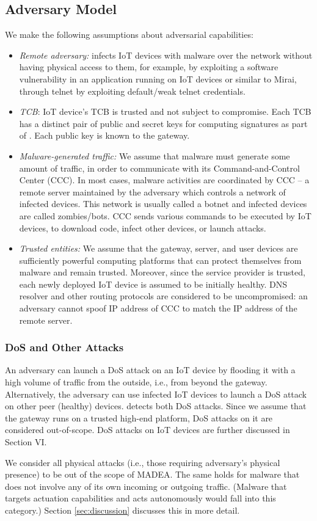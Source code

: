 \subsection{Adversary Model} \label{subsec:advesarymodel}
We make the following assumptions about adversarial capabilities: 
\begin{itemize}
    \item \textit{Remote adversary:} infects IoT devices with malware over the network without having physical access to them, for example, 
    by exploiting a software vulnerability in an application running on IoT devices or similar to Mirai, through telnet by exploiting default/weak telnet credentials.
    \item \textit{TCB}: IoT device's TCB is trusted and not subject to compromise. Each TCB has a distinct pair of public and secret keys for computing signatures as part of \ra. Each public key is known to the gateway.
    \item \textit{Malware-generated traffic:} We assume that malware must generate some amount of traffic, in order to 
    communicate with its Command-and-Control Center (CCC). In most cases, malware activities are coordinated by CCC -- a remote server maintained by the adversary which controls a network of infected devices. This network is usually called a botnet and infected devices are called zombies/bots. CCC sends various commands to be executed by IoT devices, \eg{} to download code, infect other devices, or launch attacks. 
    \item \textit{Trusted entities:} We assume that the gateway, server, and user devices are sufficiently powerful computing platforms that can protect themselves from malware and remain trusted. Moreover, since the service provider is trusted, each newly deployed IoT device is assumed to be initially healthy. DNS resolver and other routing protocols are considered to be uncompromised: an adversary cannot spoof IP address of CCC to match the IP address of the remote server.
\end{itemize}

\subsubsection{DoS and Other Attacks}
An adversary can launch a DoS attack
on an IoT device by flooding it with a high volume of traffic from
the outside, i.e., from beyond the gateway. Alternatively, the adversary can use
infected IoT devices to launch a DoS attack on other peer (healthy) devices. \system detects both DoS attacks. Since we assume
that the gateway runs on a trusted high-end platform, DoS attacks on it are considered out-of-scope. DoS attacks on IoT devices are further discussed in Section VI.

We consider all physical attacks (i.e., those requiring adversary's
physical presence) to be out of the scope of MADEA. The
same holds for malware that does not involve any of its own
incoming or outgoing traffic. (Malware that targets actuation
capabilities and acts autonomously would fall into this category.)
Section \ref{sec:discussion} discusses this in more detail.

